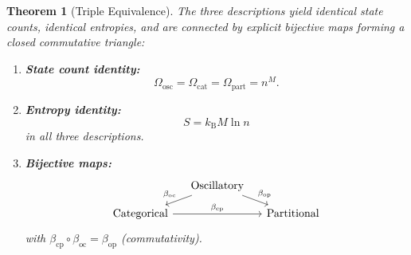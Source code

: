 \documentclass[11pt,twocolumn,a4paper]{article}
\newtheorem{theorem}{Theorem}[section]
\newcommand{\kb}{k_{\mathrm{B}}}
\begin{document}
\begin{theorem}[Triple Equivalence]
\label{thm:triple-equivalence}
The three descriptions yield identical state counts, identical
entropies, and are connected by explicit bijective maps forming a
closed commutative triangle:

\begin{enumerate}[label=(\alph*),leftmargin=*]
\item \textbf{State count identity:}
\begin{equation}
\Omega_{\mathrm{osc}} = \Omega_{\mathrm{cat}}
  = \Omega_{\mathrm{part}} = n^M.
\label{eq:state-count-identity}
\end{equation}

\item \textbf{Entropy identity:}
\begin{equation}
S = \kb M \ln n
\label{eq:entropy-identity}
\end{equation}
in all three descriptions.

\item \textbf{Bijective maps:}
\begin{equation}
\begin{tikzcd}[column sep=small, row sep=small]
& \text{Oscillatory} \arrow[dl, "\beta_{\mathrm{oc}}"'] \arrow[dr, "\beta_{\mathrm{op}}"] & \\
\text{Categorical} \arrow[rr, "\beta_{\mathrm{cp}}"] & & \text{Partitional}
\end{tikzcd}
\label{eq:commutative-triangle}
\end{equation}
with $\beta_{\mathrm{cp}} \circ \beta_{\mathrm{oc}} =
\beta_{\mathrm{op}}$ (commutativity).
\end{enumerate}
\end{theorem}
\end{document}
